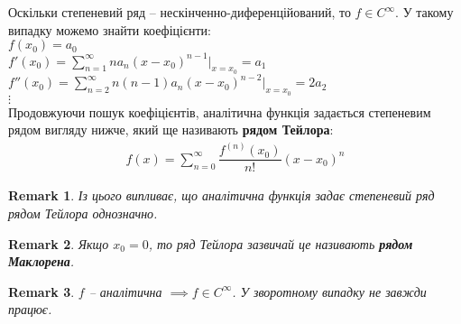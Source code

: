 \documentclass[a4paper, 10pt]{article}
\makeatletter
\def\huge{\displaystyle}
\def\qed{$\blacksquare$}
\theoremstyle{theoremdd}
\newtheorem{theorem}{Theorem}[subsection]
\theoremstyle{theoremdd}
\theoremstyle{theoremdd}
\theoremstyle{theoremdd}
\theoremstyle{theoremdd}
\theoremstyle{theoremdd}
\theoremstyle{theoremdd}
\newtheorem{remark}[theorem]{Remark}
\theoremstyle{theoremdd}
\theoremstyle{theoremdd}
\renewenvironment{proof}[1][Proof.\\]{\par
\pushQED{\hfill \qed}%
\normalfont \topsep6\p@\@plus6\p@\relax
\trivlist
\item\relax
{\bfseries
#1\@addpunct{.}}\hspace\labelsep\ignorespaces
}{%
\popQED\endtrivlist\@endpefalse
}
\makeatother
\begin{document}
Оскільки степеневий ряд -- нескінченно-диференційований, то $f \in C^\infty$. У такому випадку можемо знайти коефіцієнти:\\
$f(x_0) = a_0$\\
$f'(x_0) = \huge\sum_{n=1}^\infty n a_n(x-x_0)^{n-1} |_{x=x_0} = a_1$\\
$f''(x_0) = \huge\sum_{n=2}^\infty n(n-1) a_n(x-x_0)^{n-2} |_{x=x_0} = 2a_2$\\
$\vdots$\\
Продовжуючи пошук коефіцієнтів, аналітична функція задається степеневим рядом вигляду нижче, який ще називають \textbf{рядом Тейлора}:
\begin{align*}
f(x) = \huge\sum_{n=0}^\infty \dfrac{f^{(n)}(x_0)}{n!}(x-x_0)^n
\end{align*}

\begin{remark}
Із цього випливає, що аналітична функція задає степеневий ряд рядом Тейлора однозначно.
\end{remark}

\begin{remark}
Якщо $x_0 = 0$, то ряд Тейлора зазвичай це називають \textbf{рядом Маклорена}.
\end{remark}

\iffalse
\begin{theorem}
Для аналітичної функції $f$ степеневий ряд на $(x_0-\varepsilon,x_0+\varepsilon)$ задається єдиним чином.
\end{theorem}

\begin{remark}
Математично кажучи, якщо $\huge \sum_{n=0}^\infty a_n(x-x_0)^n = \sum_{n=0}^\infty b_n(x-x_0)^n$ на інтервалу \\ $(x_0-\varepsilon, x_0+\varepsilon)$, то $\forall n \geq 0: a_n = b_n$.
\end{remark}

\begin{proof}
$S(x_0) = a_0 = b_0$.\\
$S'(x_0) = \huge \sum_{n=1}^\infty a_n \cdot n(x-x_0)^{n-1} = \sum_{n=1}^\infty b_n \cdot n(x-x_0)^{n-1}$.\\
$\Rightarrow S'(x_0) = a_1 = b_1$.\\
$\vdots$\\
Таким чином, $\forall n \geq 0: a_n = b_n$.
\end{proof}
\fi

\begin{remark}
$f$ -- аналітична $\implies f \in C^\infty$. У зворотному випадку не завжди працює.
\end{remark}
\end{document}
